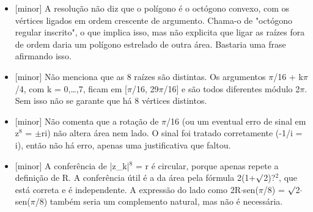 \documentclass{article}%
\begin{document}
\begin{itemize}%
\item%
{[}minor{]} A resolução não diz que o polígono é o octógono convexo, com os vértices ligados em ordem crescente de argumento. Chama{-}o de "octógono regular inscrito", o que implica isso, mas não explicita que ligar as raízes fora de ordem daria um polígono estrelado de outra área. Bastaria uma frase afirmando isso.%
\item%
{[}minor{]} Não menciona que as 8 raízes são distintas. Os argumentos $\pi$/16 + k$\pi$/4, com k = 0,\ldots{},7, ficam em {[}$\pi$/16, 29$\pi$/16{]} e são todos diferentes módulo 2$\pi$. Sem isso não se garante que há 8 vértices distintos.%
\item%
{[}minor{]} Não comenta que a rotação de $\pi$/16 (ou um eventual erro de sinal em z$^{8}$ = $\pm$ri) não altera área nem lado. O sinal foi tratado corretamente (-1/i = i), então não há erro, apenas uma justificativa que faltou.%
\item%
{[}minor{]} A conferência de |z\_k|$^{8}$ = r é circular, porque apenas repete a definição de R. A conferência útil é a da área pela fórmula 2(1+$\surd$2)?$^2$, que está correta e é independente. A expressão do lado como 2R$\cdot$sen($\pi$/8) = $\surd$2$\cdot$sen($\pi$/8) também seria um complemento natural, mas não é necessária.%
\end{itemize}%
\end{document}
